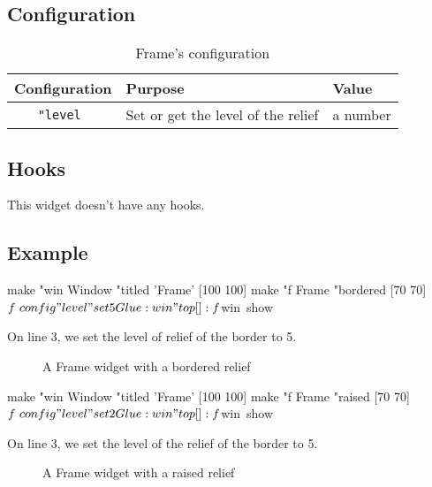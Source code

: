 \subsection{Configuration}

\begin{table}[ht]
\centering
\begin{tabular}{|c|p{5cm}|p{5cm}|}
\hline
\bf Configuration & \bf Purpose & \bf Value \\
\hline
\tt "level\index{Frame@\textbf{Frame}!Configuration!level} & Set or get the level of the relief & a number\\
\hline
\end{tabular}
\caption{Frame's configuration}
\end{table}

\subsection{Hooks}

This widget doesn't have any hooks.

\subsection{Example}

\begin{listing}{1}
make "win Window "titled 'Frame' [100 100]
make "f Frame "bordered [70 70]
$f~config "level "set 5
Glue :win "top [] :f
$win~show
\end{listing}

On line 3, we set the level of relief of the border to 5.

\begin{figure}[h!]
\centering
{}
\label{s36}
\caption{A Frame widget with a bordered relief}
\end{figure}

\begin{listing}{1}
make "win Window "titled 'Frame' [100 100]
make "f Frame "raised [70 70]
$f~config "level "set 2
Glue :win "top [] :f
$win~show
\end{listing}

On line 3, we set the level of the relief of the border to 5.

\begin{figure}[h!]
\centering
{}
\label{s37}
\caption{A Frame widget with a raised relief}
\end{figure}

